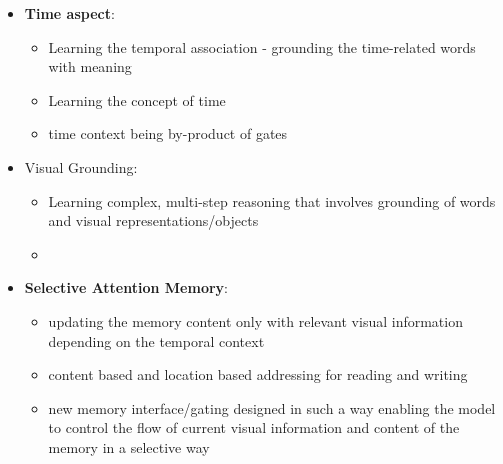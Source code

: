 \begin{itemize}
\item \textbf{Time aspect}:
\begin{itemize}
\item Learning the temporal association - grounding the time-related words with meaning
\item Learning the concept of time
\item time context being by-product of gates
\end{itemize}

\item Visual Grounding:
\begin{itemize}
\item Learning complex, multi-step reasoning that involves grounding of words and visual representations/objects
\item 
\end{itemize}
\item \textbf{Selective Attention Memory}:
\begin{itemize}
\item updating the memory content only with relevant visual information depending on the temporal context
\item content based and location based addressing for reading and writing
\item new memory interface/gating designed in such a way enabling the model to control the flow of current visual information and content of the memory in a selective way

\end{itemize}
\end{itemize}







